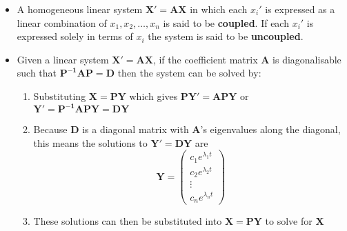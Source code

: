 \documentclass{article}
\begin{document}
\begin{itemize}
  \item A homogeneous linear system $\mathbf{X}' = \mathbf{A} \mathbf{X}$ in which each $x_i'$ is expressed as a linear combination of $x_1, x_2, \ldots, x_n$ is said to be \textbf{coupled}. If each $x_i'$ is expressed solely in terms of $x_i$ the system is said to be \textbf{uncoupled}.

  \item Given a linear system $\mathbf{X' = A X}$, if the coefficient matrix $\mathbf{A}$ is diagonalisable such that $\mathbf{P^{-1} A P = D}$ then the system can be solved by:

        \begin{enumerate}
          \item Substituting $\mathbf{X = P Y}$ which gives $\mathbf{P Y' = A P Y}$ or \\ $\mathbf{Y' = P^{-1} A P Y = D Y}$

          \item Because $\mathbf{D}$ is a diagonal matrix with $\mathbf{A}$'s eigenvalues along the diagonal, this means the solutions to $\mathbf{Y' = D Y}$ are \[\mathbf{Y} = \begin{pmatrix}
                    c_1 e^{\lambda_1 t} \\
                    c_2 e^{\lambda_2 t} \\
                    \vdots              \\
                    c_n e^{\lambda_n t}
                  \end{pmatrix}\]

          \item These solutions can then be substituted into $\mathbf{X = P Y}$ to solve for $\mathbf{X}$
        \end{enumerate}
\end{itemize}
\end{document}
